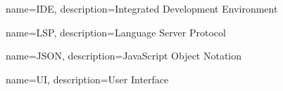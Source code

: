 {
	name=IDE,
	description={Integrated Development Environment}
}

{
	name=LSP,
	description={Language Server Protocol}
}

{
	name=JSON,
	description={JavaScript Object Notation}
}

{
	name=UI,
	description={User Interface}
}



